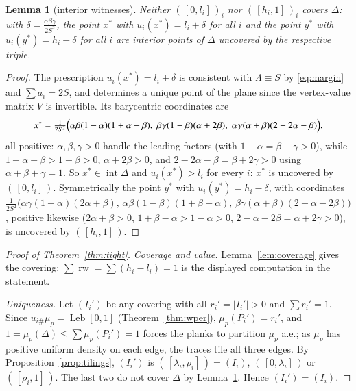 \documentclass{aims}
\numberwithin{equation}{section}
\theoremstyle{plain}
\newtheorem{lemma}[theorem]{Lemma}
\theoremstyle{definition}
\theoremstyle{remark}
\newcommand{\rw}{\operatorname{rw}}
\newcommand{\Leb}{\operatorname{Leb}}
\begin{document}
\begin{lemma}[interior witnesses]\label{lem:witness}
Neither $(\,[0,l_i]\,)_i$ nor $(\,[h_i,1]\,)_i$ covers $\Delta$: with
$\delta=\frac{\alpha\beta\gamma}{2S^2}$, the point $x^\ast$ with
$u_i(x^\ast)=l_i+\delta$ for all $i$ and the point $y^\ast$ with
$u_i(y^\ast)=h_i-\delta$ for all $i$ are interior points of $\Delta$ uncovered
by the respective triple.
\end{lemma}

\begin{proof}
The prescription $u_i(x^\ast)=l_i+\delta$ is consistent with
$\Lambda\equiv S$ by \eqref{eq:margin} and $\sum a_i=2S$, and determines a
unique point of the plane since the vertex-value matrix $V$ is invertible. Its
barycentric coordinates are
\[
x^\ast=\tfrac1{2S^2}\Bigl(\alpha\beta(1-\alpha)(1+\alpha-\beta),\;
\beta\gamma(1-\beta)(\alpha+2\beta),\;
\alpha\gamma(\alpha+\beta)(2-2\alpha-\beta)\Bigr),
\]
all positive: $\alpha,\beta,\gamma>0$ handle the leading factors (with
$1-\alpha=\beta+\gamma>0$), while $1+\alpha-\beta>1-\beta>0$, $\alpha+2\beta>0$,
and $2-2\alpha-\beta=\beta+2\gamma>0$ using $\alpha+\beta+\gamma=1$. So
$x^\ast\in\operatorname{int}\Delta$ and
$u_i(x^\ast)>l_i$ for every $i$: $x^\ast$ is uncovered by
$(\,[0,l_i]\,)$. Symmetrically the point $y^\ast$ with
$u_i(y^\ast)=h_i-\delta$, with coordinates
$\frac1{2S^2}\bigl(\alpha\gamma(1-\alpha)(2\alpha+\beta),\,
\alpha\beta(1-\beta)(1+\beta-\alpha),\,
\beta\gamma(\alpha+\beta)(2-\alpha-2\beta)\bigr)$, positive likewise
($2\alpha+\beta>0$, $1+\beta-\alpha>1-\alpha>0$,
$2-\alpha-2\beta=\alpha+2\gamma>0$), is uncovered by
$(\,[h_i,1]\,)$.
\end{proof}

\begin{proof}[Proof of Theorem~\ref{thm:tight}]
\emph{Coverage and value.} Lemma~\ref{lem:coverage} gives the covering;
$\sum\rw=\sum(h_i-l_i)=1$ is the displayed computation in the statement.

\emph{Uniqueness.} Let $(I_i')$ be any covering with all
$r_i'=|I_i'|>0$ and $\sum r_i'=1$. Since $u_{i\#}\mu_p=\Leb[0,1]$
(Theorem~\ref{thm:wper}), $\mu_p(P_i')=r_i'$, and
$1=\mu_p(\Delta)\le\sum\mu_p(P_i')=1$ forces the planks to partition $\mu_p$
a.e.; as $\mu_p$ has positive uniform density on each edge, the traces tile all
three edges. By Proposition~\ref{prop:tilings}, $(I_i')$ is $(\,[\lambda_i,
\rho_i]\,)=(I_i)$, $(\,[0,\lambda_i]\,)$ or $(\,[\rho_i,1]\,)$. The last two do
not cover $\Delta$ by Lemma~\ref{lem:witness}. Hence $(I_i')=(I_i)$.
\end{proof}
\end{document}
